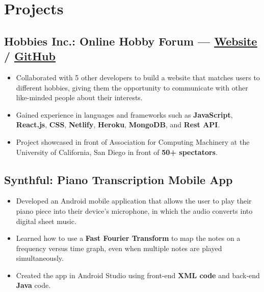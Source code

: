 \documentclass[a4,10pt]{article}
\newenvironment{zitemize}{
\begin{itemize}\itemsep0pt \parskip0pt \parsep1pt}
{\end{itemize}\vspace{-0.5cm}}
\begin{document}
\section{Projects} %



\subsection*{Hobbies Inc.: Online Hobby Forum — {\normalsize\normalfont \href{https://hobbies-inc.netlify.app/}{{\underline{\textcolor{linkblue}{Website}}}} / \href{https://github.com/acmucsd-projects/wi21-dolphin}{{\underline{\textcolor{linkblue}{GitHub}}}}} \hfill} 
    \begin{zitemize}
        \item Collaborated with 5 other developers to build a website that matches users to different hobbies, giving them the opportunity to communicate with other like-minded people about their interests.
        \item Gained experience in languages and frameworks such as \textbf{JavaScript}, \textbf{React.js}, \textbf{CSS}, \textbf{Netlify}, \textbf{Heroku}, \textbf{MongoDB}, and \textbf{Rest API}.
        \item Project showcased in front of Association for Computing Machinery at the University of California, San Diego in front of \textbf{50+ spectators}.
    \end{zitemize}


\subsection*{Synthful: Piano Transcription Mobile App {\normalsize\normalfont} \hfill} 
    \begin{zitemize}
        \item Developed an Android mobile application that allows the user to play their piano piece into their device's microphone, in which the audio converts into digital sheet music.
        \item Learned how to use a \textbf{Fast Fourier Transform} to map the notes on a frequency versus time graph, even when multiple notes are played simultaneously.
        \item Created the app in Android Studio using front-end \textbf{XML code} and back-end \textbf{Java} code.
    \end{zitemize}
\end{document}
